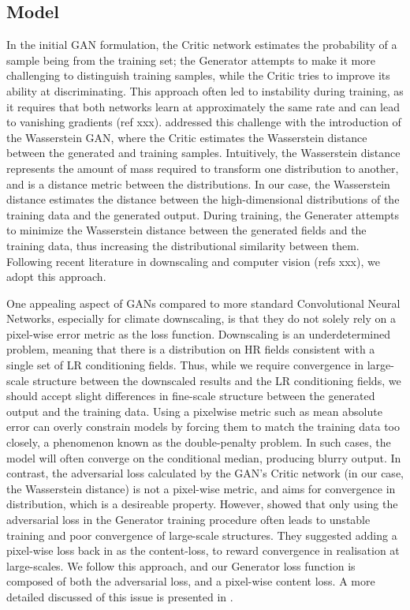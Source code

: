 \documentclass{ametsocV6.1}
\begin{document}
\subsection{Model}
In the initial GAN formulation, the Critic network estimates the probability of a sample being from the training set; the Generator attempts to make it more challenging to distinguish training samples, while the Critic tries to improve its ability at discriminating. This approach often led to instability during training, as it requires that both networks learn at approximately the same rate and can lead to vanishing gradients (ref xxx). \citet{arjovsky2017wasserstein} addressed this challenge with the introduction of the Wasserstein GAN, where the Critic estimates the Wasserstein distance between the generated and training samples. Intuitively, the Wasserstein distance represents the amount of mass required to transform one distribution to another, and is a distance metric between the distributions. In our case, the Wasserstein distance estimates the distance between the high-dimensional distributions of the training data and the generated output. During training, the Generater attempts to minimize the Wasserstein distance between the generated fields and the training data, thus increasing the distributional similarity between them. Following recent literature in downscaling and computer vision (refs xxx), we adopt this approach. 

One appealing aspect of GANs compared to more standard Convolutional Neural Networks, especially for climate downscaling, is that they do not solely rely on a pixel-wise error metric as the loss function. Downscaling is an underdetermined problem, meaning that there is a distribution on HR fields consistent with a single set of LR conditioning fields. Thus, while we require convergence in large-scale structure between the downscaled results and the LR conditioning fields, we should accept slight differences in fine-scale structure between the generated output and the training data. Using a pixelwise metric such as mean absolute error can overly constrain models by forcing them to match the training data too closely, a phenomenon known as the double-penalty problem. In such cases, the model will often converge on the conditional median, producing blurry output. In contrast, the adversarial loss calculated by the GAN's Critic network (in our case, the Wasserstein distance) is not a pixel-wise metric, and aims for convergence in distribution, which is a desireable property. However, \citet{wang2018esrgan} showed that only using the adversarial loss in the Generator training procedure often leads to unstable training and poor convergence of large-scale structures. They suggested adding a pixel-wise loss back in as the content-loss, to reward convergence in realisation at large-scales. We follow this approach, and our Generator loss function is composed of both the adversarial loss, and a pixel-wise content loss. A more detailed discussed of this issue is presented in \citet{annau2023algorithmic}.
\end{document}
